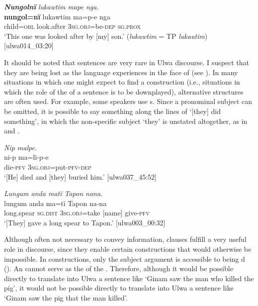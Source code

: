 \ea%
    \label{ex:syntax:284}
          \textbf{\textit{Nungolnï}} \textit{lukawtim mape nga.}\\
\gll    \textbf{nungol=nï}    lukawtim  ma=p-e      nga\\
    child=\textsc{obl}    look.after  \textsc{3sg.obj=}be\textsc{{}-dep}  \textsc{sg.prox}\\
\glt `This one was looked after by [my] son.’ (\textit{lukawtim} = TP \textit{lukautim}) [ulwa014\_03:20]
\z

It should be noted that  sentences are very rare in Ulwa discourse. I suspect that they are being lost as the language experiences  in the face of  (see ). In many situations in which one might expect to find a  construction (i.e., situations in which the role of the  of a  sentence is to be downplayed), alternative structures are often used. For example, some speakers use s. Since a pronominal subject can be omitted, it is possible to say something along the lines of ‘[they] did something’, in which the non-specific subject ‘they’ is unstated altogether, as in  and .

\ea%
    \label{ex:syntax:285}
          \textit{Nip malpe.}\\
\gll    ni-p    ma=lï{}-p-e\\
    die-\textsc{pfv}  3\textsc{sg.obj}=put-\textsc{pfv-dep}\\
\glt `[He] died and [they] buried him.’ [ulwa037\_45:52]
\z

\ea%
    \label{ex:syntax:286}
          \textit{Lungum anda matï Tapon nana.}\\
\gll    lungum  anda    ma=tï      Tapon  na-na\\
    long.spear  \textsc{sg.dist}  \textsc{3sg.obj=}take  [name]  give-\textsc{pfv}\\
\glt `[They] gave a long spear to Tapon.’ [ulwa003\_00:32]
\z

Although often not necessary to convey information,  clauses fulfill a very useful role in discourse, since they enable certain  constructions that would otherwise be impossible. In  constructions, only the subject argument is accessible to being d (). An   cannot serve as the  of the . Therefore, although it would be possible directly to translate into Ulwa a sentence like \mbox{‘Ginam} saw the man who killed the pig’, it would not be possible directly to translate into Ulwa a sentence like ‘Ginam saw the pig that the man killed’.

